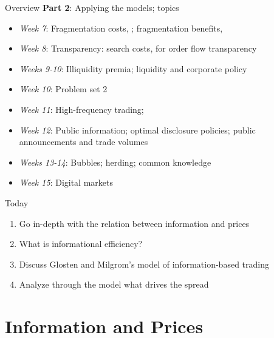 \begin{frame}{Overview}
\textbf{Part 2}: Applying the models; topics
\begin{itemize}
	\item \textit{Week 7}: Fragmentation costs, ; fragmentation benefits, 
	\item \textit{Week 8}: Transparency: search costs,  for order flow transparency
	\item \textit{Weeks 9-10}: Illiquidity premia; liquidity and corporate policy
	\item \textit{Week 10}: Problem set 2
	\item \textit{Week 11}: High-frequency trading;  
	\item \textit{Week 12}: Public information; optimal disclosure policies; public announcements and trade volumes
	\item \textit{Weeks 13-14}: Bubbles; herding; common knowledge
	\item \textit{Week 15}: Digital markets
\end{itemize}
\end{frame}


\begin{frame}{Today}
\begin{enumerate}
	\item Go in-depth with the relation between information and prices
	\item What is informational efficiency?
	\item Discuss Glosten and Milgrom's model of information-based trading
	\item Analyze through the model what drives the spread 
\end{enumerate}
\end{frame}



\section{Information and Prices}

